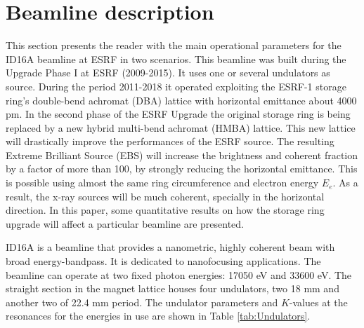 \documentclass{iucr}              %
\begin{document}

\section{Beamline description}
\label{Beamline description}

This section presents the reader with the main operational parameters for the ID16A beamline at ESRF in two scenarios. This beamline was built during the Upgrade Phase I at ESRF (2009-2015). It uses one or several undulators as source. During the period 2011-2018 it operated exploiting the ESRF-1 storage ring’s double-bend achromat (DBA) lattice with horizontal emittance about 4000 pm. In the second phase of the ESRF Upgrade the original storage ring is being replaced by a new hybrid multi-bend achromat (HMBA) lattice. This new lattice will drastically improve the performances of the ESRF source. The resulting Extreme Brilliant Source (EBS) \cite{orangebook} will increase the brightness and coherent fraction by a factor of more than 100, by strongly reducing the horizontal emittance. This is possible using almost the same ring circumference and electron energy $E_e$. As a result, the x-ray sources will be much coherent, specially in the horizontal direction. In this paper, some quantitative results on how the storage ring upgrade will affect a particular beamline are presented. 

ID16A \cite{ID16A} is a beamline that provides a nanometric, highly coherent beam with broad energy-bandpass. It is dedicated to nanofocusing applications. The beamline can operate at two fixed photon energies: 17050 eV and 33600 eV. The straight section in the magnet lattice houses four undulators, two 18 mm and another two of 22.4 mm period. The undulator parameters and $K$-values at the resonances for the energies in use are shown in Table \ref{tab:Undulators}. 
\end{document}
